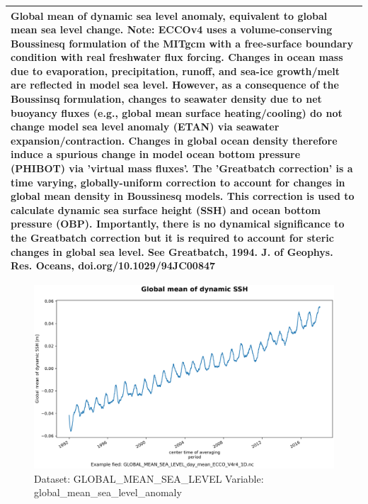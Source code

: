\begin{longtable}{|m{}|m{}|m{}|m{}|}
\multicolumn{4}{|p{1\textwidth}|}{Global mean of dynamic sea level anomaly, equivalent to global mean sea level change. Note: ECCOv4 uses a volume-conserving Boussinesq formulation of the MITgcm with a free-surface boundary condition with real freshwater flux forcing. Changes in ocean mass due to evaporation, precipitation, runoff, and sea-ice growth/melt are reflected in model sea level. However, as a consequence of the Boussinsq formulation, changes to seawater density due to net buoyancy fluxes (e.g., global mean surface heating/cooling) do not change model sea level anomaly (ETAN) via seawater expansion/contraction. Changes in global ocean density therefore induce a spurious change in model ocean bottom pressure (PHIBOT) via 'virtual mass fluxes'. The 'Greatbatch correction' is a time varying, globally-uniform correction to account for changes in global mean density in Boussinesq models. This correction is used to calculate dynamic sea surface height (SSH) and ocean bottom pressure (OBP). Importantly, there is no dynamical significance to the Greatbatch correction but it is required to account for steric changes in global sea level. See Greatbatch, 1994. J. of Geophys. Res. Oceans, doi.org/10.1029/94JC00847} \\ \hline
\end{longtable}

\begin{figure}[H]
\centering
\includegraphics[scale=0.55]{../images/plots/oneD_plots/Global_Mean_Sea_Level/global_mean_sea_level_anomaly.png}
\caption{Dataset: GLOBAL\_MEAN\_SEA\_LEVEL Variable: global\_mean\_sea\_level\_anomaly}
\label{tab:table-GLOBAL_MEAN_SEA_LEVEL_global_mean_sea_level_anomaly-Plot}
\end{figure}
\pagebreak
